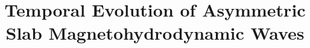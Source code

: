 \documentclass{aastex61}
\begin{document}
\title{Temporal Evolution of Asymmetric Slab Magnetohydrodynamic Waves}


\end{document}
